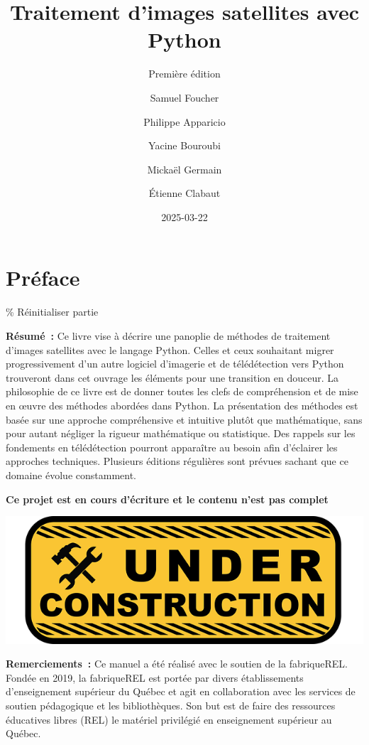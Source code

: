 \documentclass[
  11pt,
  letterpaper,
  open=any,
  twoside=false,
  french]{scrbook}
\title{Traitement d'images satellites avec Python}
\subtitle{Première édition}
\author{Samuel Foucher \and Philippe Apparicio \and Yacine
Bouroubi \and Mickaël Germain \and Étienne Clabaut}
\date{2025-03-22}
\renewcommand*\contentsname{Table des matières}
\newcommand\contentsname{Table des matières}
\begin{document}
\frontmatter
\maketitle

\renewcommand*\contentsname{Table des matières}
{
\hypersetup{linkcolor=}
\setcounter{tocdepth}{2}
\tableofcontents
}
\listoffigures
\listoftables

\mainmatter
{}

\chapter*{Préface}\label{pruxe9face}


\renewcommand{\partname}{}

\% Réinitialiser partie

\textbf{Résumé~:} Ce livre vise à décrire une panoplie de méthodes de
traitement d'images satellites avec le langage Python. Celles et ceux
souhaitant migrer progressivement d'un autre logiciel d'imagerie et de
télédétection vers Python trouveront dans cet ouvrage les éléments pour
une transition en douceur. La philosophie de ce livre est de donner
toutes les clefs de compréhension et de mise en œuvre des méthodes
abordées dans Python. La présentation des méthodes est basée sur une
approche compréhensive et intuitive plutôt que mathématique, sans pour
autant négliger la rigueur mathématique ou statistique. Des rappels sur
les fondements en télédétection pourront apparaître au besoin afin
d'éclairer les approches techniques. Plusieurs éditions régulières sont
prévues sachant que ce domaine évolue constamment.

\textbf{Ce projet est en cours d'écriture et le contenu n'est pas
complet}

\includegraphics[width=0.5\linewidth,height=\textheight,keepaspectratio]{images/logos/under-construction-2408062_640.png}\hfill

\textbf{Remerciements~:} Ce manuel a été réalisé avec le soutien de la
fabriqueREL. Fondée en 2019, la fabriqueREL est portée par divers
établissements d'enseignement supérieur du Québec et agit en
collaboration avec les services de soutien pédagogique et les
bibliothèques. Son but est de faire des ressources éducatives libres
(REL) le matériel privilégié en enseignement supérieur au Québec.
\end{document}
